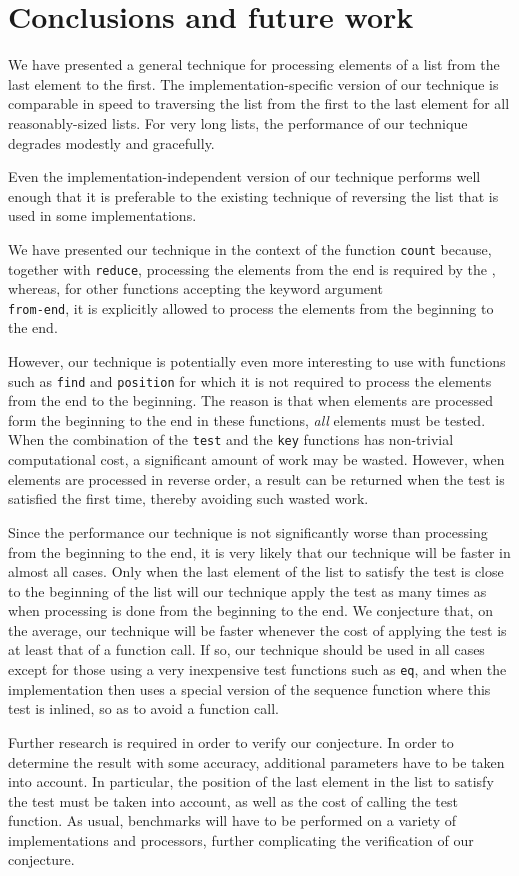 \section{Conclusions and future work}

We have presented a general technique for processing elements of a
list from the last element to the first.  The implementation-specific
version of our technique is comparable in speed to traversing the list
from the first to the last element for all reasonably-sized lists.
For very long lists, the performance of our technique degrades
modestly and gracefully.

Even the implementation-independent version of our technique performs
well enough that it is preferable to the existing technique of
reversing the list that is used in some implementations.

We have presented our technique in the context of the function
\texttt{count} because, together with \texttt{reduce}, processing the
elements from the end is required by the \hs{}, whereas, for other
func\-tions accep\-ting the key\-word ar\-gument \\
\texttt{from-end},
it is ex\-plicitly al\-lowed to process the elements from the begin\-ning to the
end.

However, our technique is potentially even more interesting to use
with functions such as \texttt{find} and \texttt{position} for which
it is not required to process the elements from the end to the
beginning.  The reason is that when elements are processed form the
beginning to the end in these functions, \emph{all} elements must be
tested.  When the combination of the \texttt{test} and the
\texttt{key} functions has non-trivial computational cost, a
significant amount of work may be wasted.  However, when elements are
processed in reverse order, a result can be returned when the test is
satisfied the first time, thereby avoiding such wasted work.

Since the performance our technique is not significant\-ly wor\-se than
processing from the beginning to the end, it is very likely that our
technique will be faster in almost all cases.  Only when the last
element of the list to satisfy the test is close to the beginning of
the list will our technique apply the test as many times as when
processing is done from the beginning to the end.  We conjecture that,
on the average, our technique will be faster whenever the cost of
applying the test is at least that of a function call.  If so, our
technique should be used in all cases except for those using a very
inexpensive test functions such as \texttt{eq}, and when the
implementation then uses a special version of the sequence function
where this test is inlined, so as to avoid a function call.

Further research is required in order to verify our conjecture.  In
order to determine the result with some accuracy, additional
parameters have to be taken into account.  In particular, the position
of the last element in the list to satisfy the test must be taken into
account, as well as the cost of calling the test function.  As usual,
benchmarks will have to be performed on a variety of implementations
and processors, further complicating the verification of our
conjecture.
